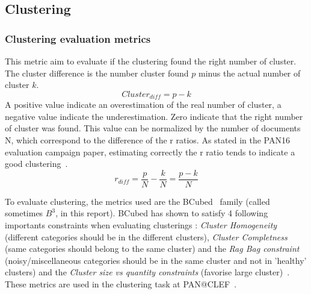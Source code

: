 \subsection{Clustering}

\subsubsection{Clustering evaluation metrics}

\begin{definition}
  This metric aim to evaluate if the clustering found the right number of cluster.
  The cluster difference is the number cluster found $p$ minus the actual number of cluster $k$.
  \begin{equation}
    Cluster_{diff} = p - k
  \end{equation}
  A positive value indicate an overestimation of the real number of cluster, a negative value indicate the underestimation.
  Zero indicate that the right number of cluster was found.
  This value can be normalized by the number of documents N, which correspond to the difference of the r ratios.
  As stated in the PAN16 evaluation campaign paper, estimating correctly the r ratio tends to indicate a good clustering~\cite{pan16}.
  \begin{equation}
    r_{diff} = \frac{p}{N} - \frac{k}{N} = \frac{p - k}{N}
  \end{equation}
\end{definition}

To evaluate clustering, the metrics used are the BCubed~\cite{bcubed} family (called sometimes $B^3$, in this report).
BCubed has shown to satisfy 4 following importants constraints when evaluating clusterings : \textit{Cluster Homogeneity} (different categories should be in the different clusters), \textit{Cluster Completness} (same categories should belong to the same cluster) and the \textit{Rag Bag constraint} (noisy/miscellaneous categories should be in the same cluster and not in 'healthy' clusters) and the \textit{Cluster size vs quantity constraints} (favorise large cluster)~\cite{bcubed}.
These metrics are used in the clustering task at PAN@CLEF~\cite{pan16}.

